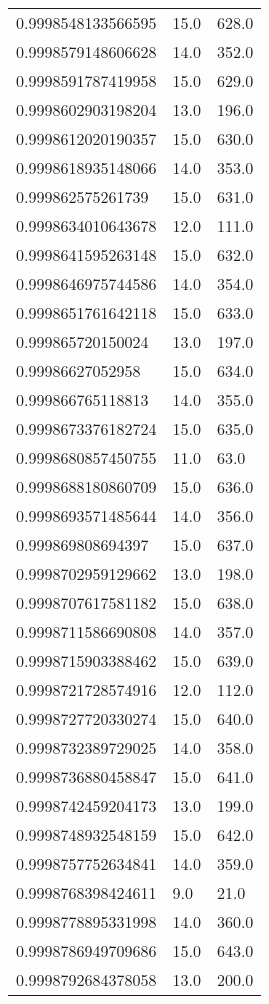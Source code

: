 \begin{center}
\begin{supertabular}[H]{p{0.30\textwidth}p{0.05\textwidth}p{0.05\textwidth}}
0.9998548133566595 & 15.0 & 628.0 \\ 
0.9998579148606628 & 14.0 & 352.0 \\ 
0.9998591787419958 & 15.0 & 629.0 \\ 
0.9998602903198204 & 13.0 & 196.0 \\ 
0.9998612020190357 & 15.0 & 630.0 \\ 
0.9998618935148066 & 14.0 & 353.0 \\ 
0.999862575261739 & 15.0 & 631.0 \\ 
0.9998634010643678 & 12.0 & 111.0 \\ 
0.9998641595263148 & 15.0 & 632.0 \\ 
0.9998646975744586 & 14.0 & 354.0 \\ 
0.9998651761642118 & 15.0 & 633.0 \\ 
0.999865720150024 & 13.0 & 197.0 \\ 
0.99986627052958 & 15.0 & 634.0 \\ 
0.999866765118813 & 14.0 & 355.0 \\ 
0.9998673376182724 & 15.0 & 635.0 \\ 
0.9998680857450755 & 11.0 & 63.0 \\ 
0.9998688180860709 & 15.0 & 636.0 \\ 
0.9998693571485644 & 14.0 & 356.0 \\ 
0.999869808694397 & 15.0 & 637.0 \\ 
0.9998702959129662 & 13.0 & 198.0 \\ 
0.9998707617581182 & 15.0 & 638.0 \\ 
0.9998711586690808 & 14.0 & 357.0 \\ 
0.9998715903388462 & 15.0 & 639.0 \\ 
0.9998721728574916 & 12.0 & 112.0 \\ 
0.9998727720330274 & 15.0 & 640.0 \\ 
0.9998732389729025 & 14.0 & 358.0 \\ 
0.9998736880458847 & 15.0 & 641.0 \\ 
0.9998742459204173 & 13.0 & 199.0 \\ 
0.9998748932548159 & 15.0 & 642.0 \\ 
0.9998757752634841 & 14.0 & 359.0 \\ 
0.9998768398424611 & 9.0 & 21.0 \\ 
0.9998778895331998 & 14.0 & 360.0 \\ 
0.9998786949709686 & 15.0 & 643.0 \\ 
0.9998792684378058 & 13.0 & 200.0 \\ 

\end{supertabular}
\end{center}
